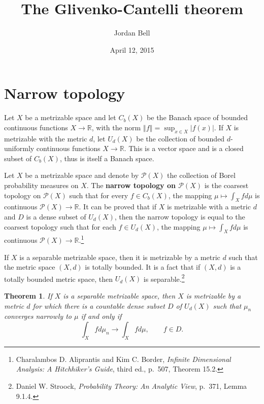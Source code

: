 \documentclass{article}
\newcommand{\norm}[1]{\left\Vert #1 \right\Vert}
\newtheorem{theorem}{Theorem}
\theoremstyle{definition}
\begin{document}
\title{The Glivenko-Cantelli theorem}
\author{Jordan Bell}
\date{April 12, 2015}

\maketitle

\section{Narrow topology}
Let $X$ be a metrizable space and let $C_b(X)$ be the Banach space of bounded continuous functions $X \to \mathbb{R}$, with the norm
$\norm{f} = \sup_{x \in X} |f(x)|$. 
If $X$ is metrizable with the metric $d$, let $U_d(X)$ be the collection of bounded $d$-uniformly continuous functions
$X \to \mathbb{R}$. This is a vector space and is a closed subset of $C_b(X)$, thus is itself a Banach space. 


Let $X$ be a  metrizable space and
denote by $\mathscr{P}(X)$ the collection of Borel probability measures on $X$.
The \textbf{narrow topology on $\mathscr{P}(X)$} is the
coarsest topology on $\mathscr{P}(X)$ such that for every $f \in C_b(X)$,  the mapping
$\mu \mapsto \int_X fd\mu$ is continuous $\mathscr{P}(X) \to \mathbb{R}$.
It can be proved that if $X$ is metrizable with a metric $d$ and $D$ is a dense subset of $U_d(X)$, then
the narrow topology is equal to the coarsest topology such that for each $f \in U_d(X)$, the mapping
$\mu \mapsto \int_X fd\mu$ is continuous $\mathscr{P}(X) \to \mathbb{R}$.\footnote{Charalambos D. 
Aliprantis and Kim C. Border, {\em Infinite Dimensional Analysis: A Hitchhiker's Guide}, third ed., p.~507,
Theorem 15.2.} 

If $X$ is a separable metrizable space, then it is metrizable by a metric $d$ such that the metric space $(X,d)$
is totally bounded. It is a fact that if $(X,d)$ is a totally bounded metric space, then
$U_d(X)$ is separable.\footnote{Daniel W. Stroock, {\em Probability Theory: An Analytic View},
p.~371, Lemma 9.1.4.}

\begin{theorem}
If $X$ is a separable metrizable space, then $X$ is metrizable by a metric $d$ for which there
is a countable dense subset $D$ of $U_d(X)$ such that $\mu_n$ converges narrowly to $\mu$ if and only if
\[
\int_X f d\mu_n \to \int_X f d\mu, \qquad f \in D.
\]
\label{Ud}
\end{theorem}
\end{document}
